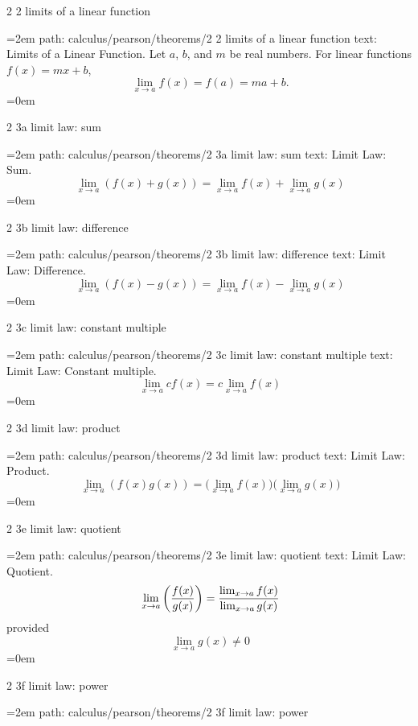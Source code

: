 \bigskip
{}
2 2 limits of a linear function
\smallskip
\par\begingroup
\leftskip=2em
path: calculus/pearson/theorems/2 2 limits of a linear function
\smallskip
text:  Limits of a Linear Function. Let $a$, $b$, and $m$ be real numbers. For linear functions $f(x) = mx + b$,  $$\ \lim_{x \to a} {f(x)} = f(a) = ma + b. $$
\smallskip
\leftskip=0em
\par\endgroup
\bigskip
{}
2 3a limit law: sum
\smallskip
\par\begingroup
\leftskip=2em
path: calculus/pearson/theorems/2 3a limit law: sum
\smallskip
text:  Limit Law: Sum. $$\ \lim_{x \to a}{ (f(x) + g(x)) } = \lim_{x \to a}{f(x)} + \lim_{x \to a}{g(x)}  $$
\smallskip
\leftskip=0em
\par\endgroup
\bigskip
{}
2 3b limit law: difference
\smallskip
\par\begingroup
\leftskip=2em
path: calculus/pearson/theorems/2 3b limit law: difference
\smallskip
text:  Limit Law: Difference. $$\ \lim_{x \to a}{ (f(x) - g(x)) } = \lim_{x \to a}{f(x)} - \lim_{x \to a}{g(x)}  $$
\smallskip
\leftskip=0em
\par\endgroup
\bigskip
{}
2 3c limit law: constant multiple
\smallskip
\par\begingroup
\leftskip=2em
path: calculus/pearson/theorems/2 3c limit law: constant multiple
\smallskip
text:  Limit Law: Constant multiple. $$\ \lim_{x \to a}{ cf(x) } = c\lim_{x \to a}{f(x)} $$
\smallskip
\leftskip=0em
\par\endgroup
\bigskip
{}
2 3d limit law: product
\smallskip
\par\begingroup
\leftskip=2em
path: calculus/pearson/theorems/2 3d limit law: product
\smallskip
text:  Limit Law: Product. $$\ \lim_{x \to a}{ (f(x)g(x)) } = \bigg( \lim_{x \to a}{f(x)} \bigg) \bigg( \lim_{x \to a}{g(x)}  \bigg) $$
\smallskip
\leftskip=0em
\par\endgroup
\bigskip
{}
2 3e limit law: quotient
\smallskip
\par\begingroup
\leftskip=2em
path: calculus/pearson/theorems/2 3e limit law: quotient
\smallskip
text:  Limit Law: Quotient. $$\ \lim_{x \to a}{ \bigg( { f(x) \over g(x) } \bigg) } = { {\lim_{x \to a}{f(x)}} \over {\lim_{x \to a}{g(x)}} } $$  provided  $$\ \lim_{x \to a}{g(x)} \ne 0 $$
\smallskip
\leftskip=0em
\par\endgroup
\bigskip
{}
2 3f limit law: power
\smallskip
\par\begingroup
\leftskip=2em
path: calculus/pearson/theorems/2 3f limit law: power
